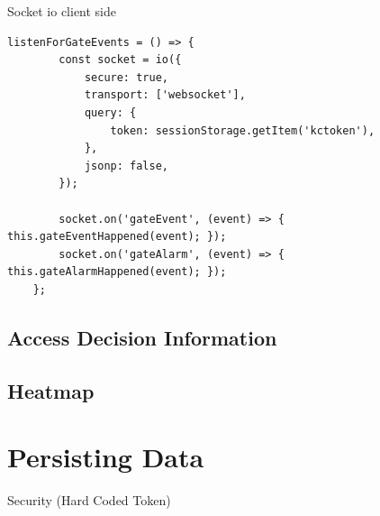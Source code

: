 Socket io client side

\begin{lstlisting}[label=socketIOClientSide]
listenForGateEvents = () => {
        const socket = io({
            secure: true,
            transport: ['websocket'],
            query: {
                token: sessionStorage.getItem('kctoken'),
            },
            jsonp: false,
        });

        socket.on('gateEvent', (event) => { this.gateEventHappened(event); });
        socket.on('gateAlarm', (event) => { this.gateAlarmHappened(event); });
    };
\end{lstlisting}

\subsection{Access Decision Information}

\subsection{Heatmap}

\section{Persisting Data}
\label{Persisting Data}


Security (Hard Coded Token)

